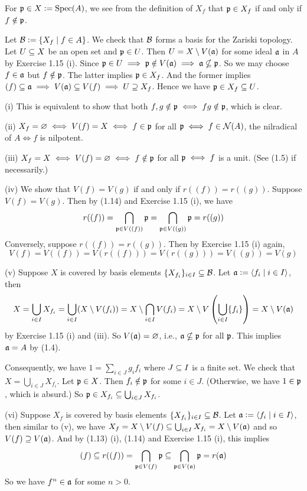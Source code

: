 \documentclass[../A&M.tex]{subfiles}
\begin{document}
For $\mathfrak{p}\in X:=\operatorname{Spec}(A)$, we see from the definition of $X_f$ that $\mathfrak{p}\in X_f$ if and only if $f\notin\mathfrak{p}$.

Let $\mathcal{B}:=\{ X_f \mid f\in A\}$. We check that $\mathcal{B}$ forms a basis for the Zariski topology. Let $U\subseteq X$ be an open set and $\mathfrak{p}\in U$. Then $U=X \setminus V(\mathfrak{a})$ for some ideal $\mathfrak{a}$ in $A$ by Exercise 1.15 (i). Since $\mathfrak{p}\in U \implies \mathfrak{p}\notin V(\mathfrak{a}) \implies \mathfrak{a}\nsubseteq\mathfrak{p}$. So we may choose $f\in\mathfrak{a}$ but $f\notin\mathfrak{p}$. The latter implies $\mathfrak{p}\in X_f$. And the former implies $(f)\subseteq\mathfrak{a} \implies V(\mathfrak{a})\subseteq V(f) \implies U\supseteq X_f$. Hence we have $\mathfrak{p} \in X_f \subseteq U$.

(i) This is equivalent to show that both $f,g \notin \mathfrak{p} \iff fg \notin \mathfrak{p}$, which is clear.

(ii) $X_f=\varnothing \iff V(f)=X \iff f\in\mathfrak{p}$ for all $\mathfrak{p} \iff f\in \mathcal{N}(A)$, the nilradical of $A \iff f$ is nilpotent.

(iii) $X_f=X \iff V(f)=\varnothing \iff f\notin\mathfrak{p}$ for all $\mathfrak{p} \iff f$ is a unit. (See (1.5) if necessarily.)

(iv) We show that $V(f)=V(g)$ if and only if $r((f))=r((g))$. Suppose $V(f)=V(g)$. Then by (1.14) and Exercise 1.15 (i), we have
$$
r((f)) = \bigcap_{\mathfrak{p}\in V((f))} \mathfrak{p} = \bigcap_{\mathfrak{p}\in V((g))} \mathfrak{p} = r((g))
$$
Conversely, suppose $r((f))=r((g))$. Then by Exercise 1.15 (i) again,
$$
V(f) = V((f)) = V(r((f))) = V(r((g))) = V((g)) = V(g)
$$

(v) Suppose $X$ is covered by basis elements $\{X_{f_i}\}_{i\in I} \subseteq \mathcal{B}$. Let $\mathfrak{a}:=\langle f_i \mid i\in I \rangle$, then
$$
X = \bigcup_{i\in I} X_{f_i} = \bigcup_{i\in I} (X\setminus V(f_i)) = X\setminus  \bigcap_{i\in I} V(f_i) = X \setminus V\left( \bigcup_{i\in I} \{f_i\} \right) = X\setminus V(\mathfrak{a})
$$
by Exercise 1.15 (i) and (iii). So $V(\mathfrak{a})=\varnothing$, i.e., $\mathfrak{a}\nsubseteq\mathfrak{p}$ for all $\mathfrak{p}$. This implies $\mathfrak{a}=A$ by (1.4).

Consequently, we have $1=\sum_{i\in J} g_if_i$ where $J\subseteq I$ is a finite set. We check that $X=\bigcup_{i\in J} X_{f_i}$. Let $\mathfrak{p}\in X$. Then $f_i\notin \mathfrak{p}$ for some $i\in J$. (Otherwise, we have $1\in \mathfrak{p}$, which is absurd.) So $\mathfrak{p}\in X_{f_i} \subseteq \bigcup_{i\in J} X_{f_i}$.

(vi) Suppose $X_f$ is covered by basis elements $\{X_{f_i}\}_{i\in I} \subseteq \mathcal{B}$. Let $\mathfrak{a}:=\langle f_i \mid i\in I \rangle$, then similar to (v), we have $X_f = X\setminus V(f) \subseteq \bigcup_{i\in I} X_{f_i} = X\setminus V(\mathfrak{a})$ and so $V(f)\supseteq V(\mathfrak{a})$. And by (1.13) (i), (1.14) and Exercise 1.15 (i), this implies
$$
(f) \subseteq r((f)) = \bigcap_{\mathfrak{p}\in V(f)} \mathfrak{p} \subseteq \bigcap_{\mathfrak{p}\in V(\mathfrak{a})} \mathfrak{p} = r(\mathfrak{a})
$$
So we have $f^n\in\mathfrak{a}$ for some $n>0$.
\end{document}
